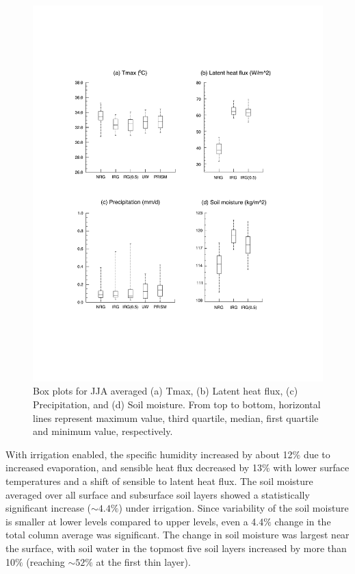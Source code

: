 \begin{figure}
\begin{center}
\includegraphics[width=6in]{irrig_boxplot.pdf}
\caption{Box plots for JJA averaged  (a) Tmax, (b) Latent heat flux, (c) Precipitation, and (d) Soil moisture.  From top to bottom, horizontal lines represent maximum value, third quartile, median, first quartile and minimum value, respectively.} 
\label{fig:Figure 4}
\end{center}
\end{figure}

With irrigation enabled, the specific humidity increased by about 12$\%$ due to increased evaporation, and sensible heat flux decreased by 13\% with lower surface temperatures and a shift of sensible to latent heat flux. The soil moisture averaged over all surface and subsurface soil layers showed a statistically significant increase ($\sim4.4\%$) under irrigation. Since variability of the soil moisture is smaller at lower levels compared to upper levels, even a 4.4$\%$ change in the total column average was significant.  The change in soil moisture was largest near the surface, with soil water in the topmost five soil layers increased by more than 10$\%$ (reaching $\sim52\%$ at the first thin layer).


